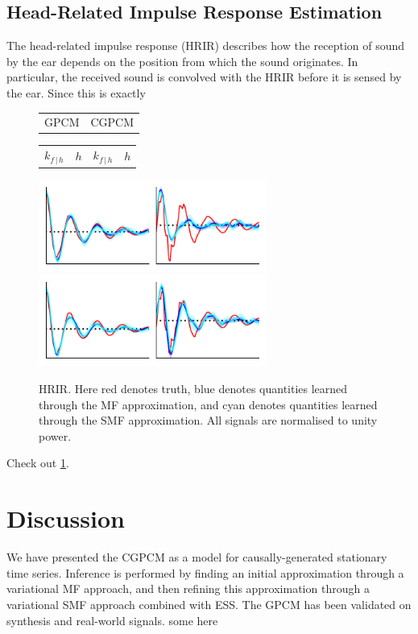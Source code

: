 \documentclass{article}
\newcommand{\cond}{\, | \,}               %
\begin{document}
\subsection{Head-Related Impulse Response Estimation}
The head-related impulse response (HRIR) describes how the reception of sound by the ear depends on the position from which the sound originates. In particular, the received sound is convolved with the HRIR before it is sensed by the ear. Since this is exactly

\begin{figure}[t]
    \centering
    \begin{tabularx}{\linewidth}{>{\centering}X>{\centering}X}
        GPCM & CGPCM
    \end{tabularx}
    \begin{tabularx}{\linewidth}{>{\centering}X>{\centering}X>{\centering}X>{\centering}X}
        $k_{f\cond h}$ & $h$ & $k_{f\cond h}$ & $h$
    \end{tabularx}
    \includegraphics[width=.49\linewidth, height=3cm]{resources/hrtf_gpcm.pdf}
    \includegraphics[width=.49\linewidth, height=3cm]{resources/hrtf_cgpcm.pdf}
    \caption{HRIR. Here {\color{red}red} denotes truth, {\color{blue}blue} denotes quantities learned through the MF approximation, and {\color{mycyan}cyan} denotes quantities learned through the SMF approximation. All signals are normalised to unity power.}
    \label{fig:hrir}
\end{figure}

Check out \cref{fig:hrir}.


\section{Discussion}
We have presented the CGPCM as a model for causally-generated stationary time series. Inference is performed by finding an initial approximation through a variational MF approach, and then refining this approximation through a variational SMF approach combined with ESS. The GPCM has been validated on synthesis and real-world signals. {\color{red} some here}
\end{document}

